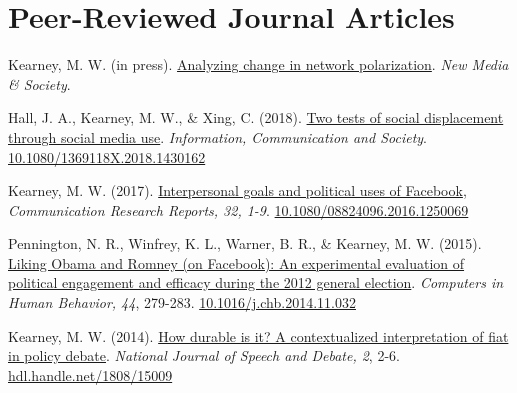 \section{Peer-Reviewed Journal Articles}
\begin{bibenum}

\item Kearney, M. W. (in press).
	\href{http://journals.sagepub.com/doi/full}{Analyzing change in network polarization}.
	\textit{New Media \& Society}.

\item Hall, J. A., Kearney, M. W., \& Xing, C. (2018).
	\href{https://www.tandfonline.com/doi/abs/10.1080/1369118X.2018.1430162}{Two tests of social displacement through social media use}.
	\textit{Information, Communication and Society}.
	\href{https://doi.org/10.1080/1369118X.2018.1430162}{10.1080/1369118X.2018.1430162}

\item Kearney, M. W. (2017).
	\href{http://www.tandfonline.com/doi/abs/10.1080/08824096.2016.1250069}{Interpersonal goals and political uses of Facebook},
	\textit{Communication Research Reports, 32, 1-9}.
	\href{https://doi.org/10.1080/08824096.2016.1250069}{10.1080/08824096.2016.1250069}

\item Pennington, N. R., Winfrey, K. L., Warner, B. R., \& Kearney, M. W. (2015).
	\href{https://www.sciencedirect.com/science/article/pii/S0747563214006347}{Liking Obama and Romney (on Facebook): An experimental evaluation of political engagement and efficacy during the 2012 general election}.
	\textit{Computers in Human Behavior, 44}, 279-283.
	\href{https://doi.org/10.1016/j.chb.2014.11.032}{10.1016/j.chb.2014.11.032}

\item Kearney, M. W. (2014). \href{http://ssrn.com/abstract=2618298}{
	How durable is it? A contextualized interpretation of fiat in policy debate}.
	\textit{National Journal of Speech and Debate, 2}, 2-6.
	\href{http://hdl.handle.net/1808/15009}{hdl.handle.net/1808/15009}

\end{bibenum}


